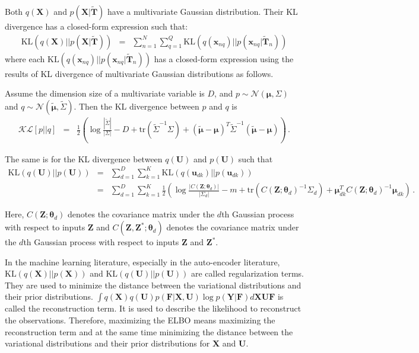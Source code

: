 \documentclass{article}
\begin{document}
Both $q(\bm X)$ and $p(\bm X|\tilde{\bm T})$ have a multivariate Gaussian distribution. Their KL divergence has a closed-form expression such that:
\begin{eqnarray}
\mathrm{KL}(q(\bm X)||p(\bm X|\tilde{\bm T})) & = & \sum_{n = 1}^{N}\sum_{q = 1}^{Q}\mathrm{KL}\left(q(\bm x_{nq})||p(\bm x_{nq}|\tilde{\bm T}_n)\right) \nonumber 
\end{eqnarray}
where each $\mathrm{KL}\left(q(\bm x_{nq})||p(\bm x_{nq}|\tilde{\bm T}_n)\right)$ has a closed-form expression using the results of KL divergence of multivariate Gaussian distributions as follows.

Assume the dimension size of a multivariate variable is $D$, and $p \sim \mathcal{N}(\bm \mu, \Sigma)$ and $q \sim \mathcal{N}(\tilde{\bm\mu}, \tilde{\Sigma})$. Then the KL divergence between $p$ and $q$ is
\begin{eqnarray}
\mathcal{KL}[p||q] & = & \frac{1}{2}\left(\log\frac{|\tilde{\Sigma}|}{|\Sigma|} - D + \mathrm{tr}(\tilde{\Sigma}^{-1}\Sigma) + (\tilde{\bm \mu} - \bm \mu)^T\tilde{\Sigma}^{-1}(\tilde{\bm \mu} - \bm \mu) \right)\,.
\label{KL_MN}
\end{eqnarray} 

The same is for the KL divergence between $q(\bm U)$ and $p(\bm U)$ such that
{\footnotesize
	\begin{eqnarray}
	\mathrm{KL}\left(q(\bm U)||p(\bm U)\right) & = & \sum_{d=1}^{D}\sum_{k = 1}^{K}\mathrm{KL}(q(\bm u_{dk})||p(\bm u_{dk})) \nonumber \\
	& = & \sum_{d=1}^{D}\sum_{k = 1}^{K}\frac{1}{2}\left(\log\frac{|C(\bm Z;\bm\theta_d)|}{|\Sigma_d|} - m + \mathrm{tr}(C(\bm Z;\bm\theta_d)^{-1}\Sigma_d) + \bm\mu_{dk}^TC(\bm Z;\bm\theta_d)^{-1}\bm\mu_{dk}\right) \,. \nonumber
	\end{eqnarray}
}

Here, $C(\bm Z; \bm \theta_d)$ denotes the covariance matrix under the $d$th Gaussian process with respect to inputs $\bm Z$ and $C(\bm Z, \bm Z^*; \bm \theta_d)$ denotes the covariance matrix under the $d$th Gaussian process with respect to inputs $\bm Z$ and $\bm Z^*$.

In the machine learning literature, especially in the auto-encoder literature, $\mathrm{KL}(q(\bm X)|| p(\bm X))$ and $\mathrm{KL}(q(\bm U)|| p(\bm U))$ are called regularization terms. They are used to minimize the distance between the variational distributions and their prior distributions. $\int q(\bm X) q(\bm U)p(\bm F|\bm X, \bm U)\log p(\bm Y|\bm F) d\bm X\bm U\bm F$ is called the reconstruction term. It is used to describe the likelihood to reconstruct the observations. Therefore, maximizing the ELBO means maximizing the reconstruction term and at the same time minimizing the distance between the variational distributions and their prior distributions for $\bm X$ and $\bm U$.
\end{document}
